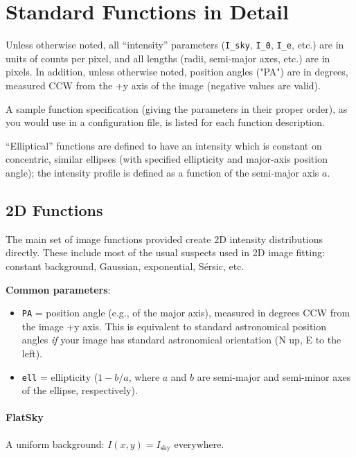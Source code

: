 \documentclass[10pt,a4paper,article]{memoir}
\begin{document}
\newpage

\appendix
\chapter{Standard Functions in Detail}\label{app:functions}

Unless otherwise noted, all ``intensity'' parameters (\texttt{I\_sky},
\texttt{I\_0}, \texttt{I\_e}, etc.) are in units of counts per pixel, and all
lengths (radii, semi-major axes, etc.) are in pixels. In addition, unless
otherwise noted, position angles ("PA") are in degrees, measured CCW from
the +y axis of the image (negative values are valid).

A sample function specification (giving the parameters in their proper order),
as you would use in a configuration file, is listed for each function
description.

``Elliptical'' functions are defined to have an intensity which is constant on
concentric, similar ellipses (with specified ellipticity and major-axis position angle);
the intensity profile is defined as a function of the semi-major axis $a$.


\section{2D Functions}

The main set of image functions provided create 2D intensity distributions
directly. These include most of the usual suspects used in 2D image fitting:
constant background, Gaussian, exponential, S{\'e}rsic, etc.

\medskip

\textbf{Common parameters}: 
\begin{itemize}
\item \texttt{PA} = position angle (e.g., of the major axis), measured in degrees CCW from
the image +y axis. This is equivalent to standard astronomical position angles \textit{if}
your image has standard astronomical orientation (N up, E to the left).
\item \texttt{ell} = ellipticity ($1 - b/a$, where $a$ and $b$ are semi-major and semi-minor
axes of the ellipse, respectively).
\end{itemize}


\subsubsection{FlatSky}

A uniform background: $I(x,y) = I_{\mathrm{sky}}$ everywhere.
\end{document}
